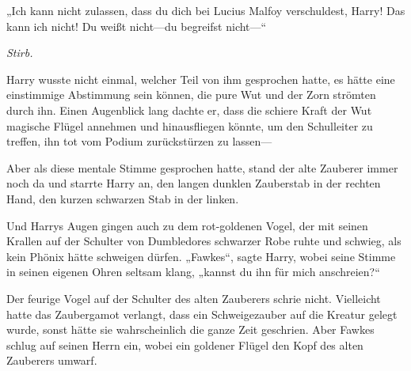 „Ich kann nicht zulassen, dass du dich bei Lucius Malfoy verschuldest, Harry! Das kann ich nicht! Du weißt nicht—du begreifst nicht—“

\emph{Stirb.}

Harry wusste nicht einmal, welcher Teil von ihm gesprochen hatte, es hätte eine einstimmige Abstimmung sein können, die pure Wut und der Zorn strömten durch ihn. Einen Augenblick lang dachte er, dass die schiere Kraft der Wut magische Flügel annehmen und hinausfliegen könnte, um den Schulleiter zu treffen, ihn tot vom Podium zurückstürzen zu lassen—

Aber als diese mentale Stimme gesprochen hatte, stand der alte Zauberer immer noch da und starrte Harry an, den langen dunklen Zauberstab in der rechten Hand, den kurzen schwarzen Stab in der linken.

Und Harrys Augen gingen auch zu dem rot-goldenen Vogel, der mit seinen Krallen auf der Schulter von Dumbledores schwarzer Robe ruhte und schwieg, als kein Phönix hätte schweigen dürfen.
„Fawkes“, sagte Harry, wobei seine Stimme in seinen eigenen Ohren seltsam klang, „kannst du ihn für mich anschreien?“

Der feurige Vogel auf der Schulter des alten Zauberers schrie nicht. Vielleicht hatte das Zaubergamot verlangt, dass ein Schweigezauber auf die Kreatur gelegt wurde, sonst hätte sie wahrscheinlich die ganze Zeit geschrien. Aber Fawkes schlug auf seinen Herrn ein, wobei ein goldener Flügel den Kopf des alten Zauberers umwarf.

